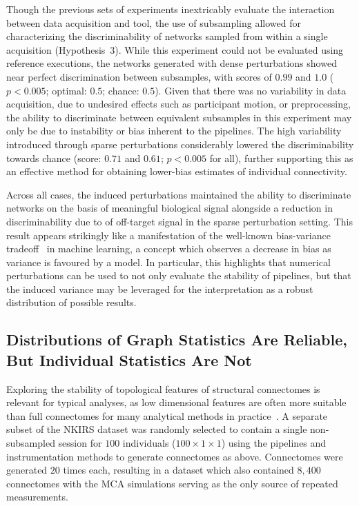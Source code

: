 \documentclass[10pt,letterpaper]{article}
\begin{document}
Though the previous sets of experiments inextricably evaluate the interaction between
data acquisition and tool, the use of subsampling allowed for characterizing the
discriminability of networks sampled from within a single acquisition (Hypothesis~3).
While this experiment could not be evaluated using reference executions, the networks
generated with dense perturbations showed near perfect discrimination between
subsamples, with scores of $0.99$ and $1.0$ ($p < 0.005$; optimal: $0.5$; chance:
$0.5$). Given that there was no variability in data acquisition, due to undesired
effects such as participant motion, or preprocessing, the ability to discriminate
between equivalent subsamples in this experiment may only be due to instability or
bias inherent to the pipelines. The high variability introduced through sparse
perturbations considerably lowered the discriminability towards chance (score: $0.71$
and $0.61$; $p < 0.005$ for all), further supporting this as an effective method for
obtaining lower-bias estimates of individual connectivity.

Across all cases, the induced perturbations maintained the ability to discriminate
networks on the basis of meaningful biological signal alongside a reduction in
discriminability due to of off-target signal in the sparse perturbation setting. This
result appears strikingly like a manifestation of the well-known bias-variance
tradeoff~\cite{geman1992neural} in machine learning, a concept which observes a
decrease in bias as variance is favoured by a model. In particular, this highlights
that numerical perturbations can be used to not only evaluate the stability of
pipelines, but that the induced variance may be leveraged for the interpretation as a
robust distribution of possible results.


\subsection*{Distributions of Graph Statistics Are Reliable, But Individual Statistics Are Not}

Exploring the stability of topological features of structural connectomes is relevant
for typical analyses, as low dimensional features are often more suitable than full
connectomes for many analytical methods in practice~\cite{Rubinov2010-fh}. A separate
subset of the NKIRS dataset was randomly selected to contain a single non-subsampled
session for $100$ individuals ($100 \times 1 \times 1$) using the pipelines and
instrumentation methods to generate connectomes as above. Connectomes were generated
$20$ times each, resulting in a dataset which also contained $8,400$ connectomes with
the MCA simulations serving as the only source of repeated measurements.
\end{document}
